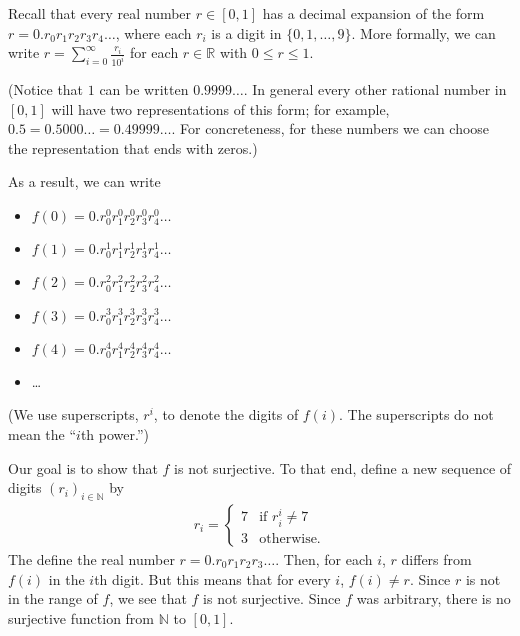 \documentclass[letterpaper,10pt,english]{sphinxmanual}
\begin{document}
\sphinxAtStartPar
Recall that every real number \(r \in [0,1]\) has a decimal expansion of the form \(r = 0.r_0 r_1 r_2 r_3 r_4 \ldots\), where each \(r_i\) is a digit in \(\{0, 1, \ldots, 9\}\). More formally, we can write \(r = \sum_{i = 0}^\infty \frac{r_i}{10^{i}}\) for each \(r \in \mathbb{R}\) with \(0 \leq r \leq 1\).

\sphinxAtStartPar
(Notice that \(1\) can be written \(0.9999\ldots\). In general every other rational number in \([0,1]\) will have two representations of this form; for example, \(0.5 = 0.5000\ldots = 0.49999\ldots\). For concreteness, for these numbers we can choose the representation that ends with zeros.)

\sphinxAtStartPar
As a result, we can write
\begin{itemize}
\item {} 
\sphinxAtStartPar
\(f(0) = 0.r^0_0 r^0_1 r^0_2 r^0_3 r^0_4 \ldots\)

\item {} 
\sphinxAtStartPar
\(f(1) = 0.r^1_0 r^1_1 r^1_2 r^1_3 r^1_4 \ldots\)

\item {} 
\sphinxAtStartPar
\(f(2) = 0.r^2_0 r^2_1 r^2_2 r^2_3 r^2_4 \ldots\)

\item {} 
\sphinxAtStartPar
\(f(3) = 0.r^3_0 r^3_1 r^3_2 r^3_3 r^3_4 \ldots\)

\item {} 
\sphinxAtStartPar
\(f(4) = 0.r^4_0 r^4_1 r^4_2 r^4_3 r^4_4 \ldots\)

\item {} 
\sphinxAtStartPar
…

\end{itemize}

\sphinxAtStartPar
(We use superscripts, \(r^i\), to denote the digits of \(f(i)\). The superscripts do not mean the “\(i\)th power.”)

\sphinxAtStartPar
Our goal is to show that \(f\) is not surjective. To that end, define a new sequence of digits \((r_i)_{i \in \mathbb{N}}\) by
\begin{equation*}
\begin{split}r_i = \begin{cases}
        7 & \mbox{if $r^i_i \neq 7$} \\
        3 & \mbox{otherwise.}
      \end{cases}\end{split}
\end{equation*}
\sphinxAtStartPar
The define the real number \(r = 0.r_0 r_1 r_2 r_3 \ldots\). Then, for each \(i\), \(r\) differs from \(f(i)\) in the \(i\)th digit. But this means that for every \(i\), \(f(i) \neq r\). Since \(r\) is not in the range of \(f\), we see that \(f\) is not surjective. Since \(f\) was arbitrary, there is no surjective function from \(\mathbb{N}\) to \([0,1]\).
\end{document}

